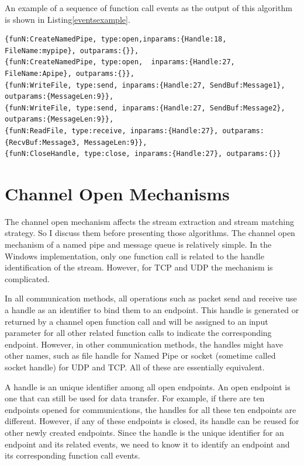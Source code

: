 An example of a sequence of function call events as the output of this algorithm is shown in Listing\ref{eventsexample}.

\begin{lstlisting}[caption= Example of  $etr$, label=eventsexample]
{funN:CreateNamedPipe, type:open,inparams:{Handle:18, FileName:mypipe}, outparams:{}},
{funN:CreateNamedPipe, type:open,  inparams:{Handle:27,  FileName:Apipe}, outparams:{}},
{funN:WriteFile, type:send, inparams:{Handle:27, SendBuf:Message1}, outparams:{MessageLen:9}},
{funN:WriteFile, type:send, inparams:{Handle:27, SendBuf:Message2}, outparams:{MessageLen:9}},
{funN:ReadFile, type:receive, inparams:{Handle:27}, outparams:{RecvBuf:Message3, MessageLen:9}},
{funN:CloseHandle, type:close, inparams:{Handle:27}, outparams:{}}
\end{lstlisting}

\section{Channel Open Mechanisms}\label{mecha}
The channel open mechanism affects the stream extraction and stream matching strategy. So I discuss them before presenting those algorithms. The channel open mechanism of a named pipe and message queue is relatively simple. In the Windows implementation, only one function call is related to the handle identification of the stream. However, for TCP and UDP the mechanism is complicated.

In all communication methods, all operations such as packet send and receive use a handle as an identifier to bind them to an endpoint. This handle is generated or returned by a channel open function call and will be assigned to an input parameter for all other related function calls to indicate the corresponding endpoint. However, in other communication methods, the handles might have other names, such as file handle for Named Pipe or socket (sometime called socket handle) for UDP and TCP. All of these are essentially equivalent.

A handle is an unique identifier among all open endpoints. An open endpoint is one that can still be used for data transfer. For example, if there are ten endpoints opened for communications, the handles for all these ten endpoints are different. However, if any of these endpoints is closed, its handle can be reused for other newly created endpoints. Since the handle is the unique identifier for an endpoint and its related events, we need to know it to identify an endpoint and its corresponding function call events. 

